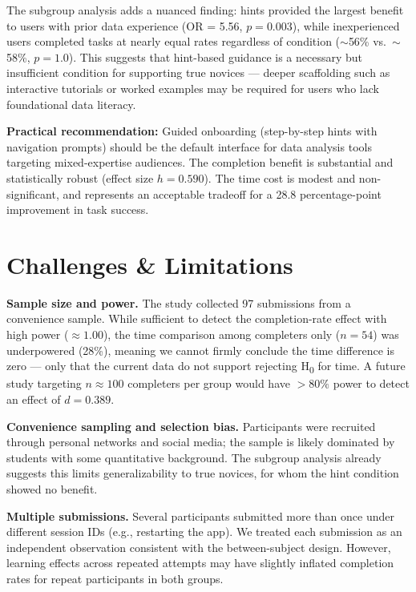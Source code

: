 \documentclass[11pt, a4paper]{article}
\begin{document}
The subgroup analysis adds a nuanced finding: hints provided the largest benefit
to users with prior data experience (OR = 5.56, $p = 0.003$), while inexperienced
users completed tasks at nearly equal rates regardless of condition ($\sim$56\% vs.\
$\sim$58\%, $p = 1.0$). This suggests that hint-based guidance is a necessary but
insufficient condition for supporting true novices --- deeper scaffolding such as
interactive tutorials or worked examples may be required for users who lack
foundational data literacy.

\textbf{Practical recommendation:} Guided onboarding (step-by-step hints with
navigation prompts) should be the default interface for data analysis tools
targeting mixed-expertise audiences. The completion benefit is substantial and
statistically robust (effect size $h = 0.590$). The time cost is modest and
non-significant, and represents an acceptable tradeoff for a 28.8 percentage-point
improvement in task success.

\section{Challenges \& Limitations}

\textbf{Sample size and power.}
The study collected 97 submissions from a convenience sample. While sufficient to
detect the completion-rate effect with high power ($\approx 1.00$), the time
comparison among completers only ($n = 54$) was underpowered (28\%), meaning we
cannot firmly conclude the time difference is zero --- only that the current data
do not support rejecting H\textsubscript{0} for time. A future study targeting
$n \approx 100$ completers per group would have $> 80\%$ power to detect an effect
of $d = 0.389$.

\textbf{Convenience sampling and selection bias.}
Participants were recruited through personal networks and social media; the sample
is likely dominated by students with some quantitative background. The subgroup
analysis already suggests this limits generalizability to true novices, for whom
the hint condition showed no benefit.

\textbf{Multiple submissions.}
Several participants submitted more than once under different session IDs (e.g.,
restarting the app). We treated each submission as an independent observation
consistent with the between-subject design. However, learning effects across
repeated attempts may have slightly inflated completion rates for repeat
participants in both groups.
\end{document}
